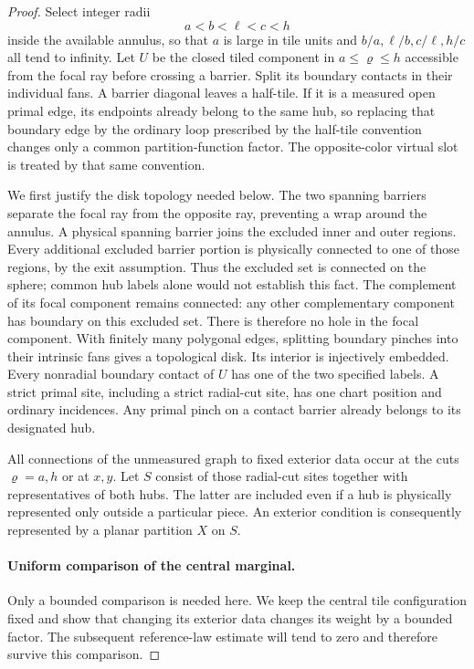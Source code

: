 \begin{proof}
Select integer radii
\begin{equation}\label{eq:disk-join-radii}
 a<b<\ell<c<h
\end{equation}
inside the available annulus, so that $a$ is large in tile units and
$b/a,\ell/b,c/\ell,h/c$ all tend to infinity.  Let $U$ be the closed
tiled component in $a\le\varrho\le h$ accessible from the focal ray before
crossing a barrier.  Split its boundary contacts in their individual
fans.  A barrier diagonal leaves a half-tile.  If it is a measured open
primal edge, its endpoints already belong to the same hub, so replacing
that boundary edge by the ordinary loop prescribed by the half-tile
convention changes only a common partition-function factor.  The
opposite-color virtual slot is treated by that same convention.

We first justify the disk topology needed below.  The two spanning
barriers separate the focal ray from the opposite ray, preventing a
wrap around the annulus.  A physical spanning barrier joins the
excluded inner and outer regions.  Every additional excluded barrier
portion is physically connected to one of those regions, by the exit
assumption.  Thus the excluded set is connected on the sphere; common
hub labels alone would not establish this fact.  The complement of
its focal component remains connected:
any other complementary component has boundary on this excluded set.
There is therefore no hole in the focal component.  With finitely
many polygonal edges, splitting boundary pinches into their intrinsic
fans gives a topological disk.  Its interior is injectively embedded.
Every nonradial boundary contact of $U$ has one of the two specified
labels.  A strict primal site, including a strict radial-cut site, has
one chart position and ordinary incidences.  Any primal pinch on a
contact barrier already belongs to its designated hub.

All connections of the unmeasured graph to fixed exterior data occur
at the cuts $\varrho=a,h$ or at $x,y$.  Let $S$ consist of those radial-cut
sites together with representatives of both hubs.  The latter are
included even if a hub is physically represented only outside a
particular piece.  An exterior condition is consequently represented
by a planar partition $X$ on $S$.

\paragraph{Uniform comparison of the central marginal.}
Only a bounded comparison is needed here. We keep the central tile
configuration fixed and show that changing its exterior data changes
its weight by a bounded factor. The subsequent reference-law estimate
will tend to zero and therefore survive this comparison.


\end{proof}
